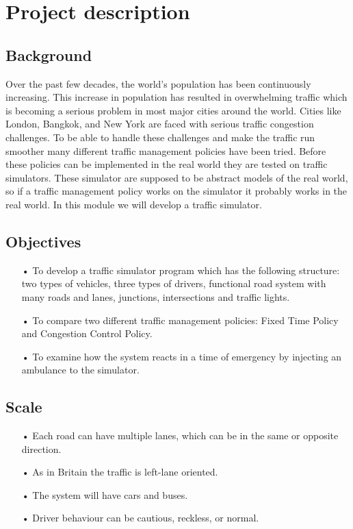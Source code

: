 \documentclass[11pt]{article}
\begin{document}

\section{Project description}

\subsection{Background}
Over the past few decades, the world's population has been continuously increasing. This increase in population has resulted in overwhelming traffic which is becoming a serious problem in most major cities around the world. Cities like London, Bangkok, and New York are faced with serious traffic congestion challenges. To be able to handle these challenges and make the traffic run smoother many different traffic management policies have been tried. Before these policies can be implemented in the real world they are tested on traffic simulators. These simulator are supposed to be abstract models of the real world, so if a traffic management policy works on the simulator it probably works in the real world. In this module we will develop a traffic simulator.


\subsection{Objectives}
\begin{itemize}
\item[•] To develop a traffic simulator program which has the following structure: two types of vehicles, three types of drivers, functional road system with many roads and lanes, junctions, intersections and traffic lights.
\item[•] To compare two different traffic management policies: Fixed Time Policy and Congestion Control Policy.
\item[•] To examine how the system reacts in a time of emergency by injecting an ambulance to the simulator.
\end{itemize}

\subsection{Scale}
\begin{itemize}
\item[•] Each road can have multiple lanes, which can be in the same or opposite direction.
\item[•] As in Britain the traffic is left-lane oriented.
\item[•] The system will have cars and buses.
\item[•] Driver behaviour can be cautious, reckless, or normal.
\end{itemize}
\end{document}

